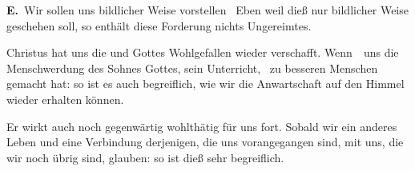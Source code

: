 \begin{aufza}
\vabst \textbf{E.}~Wir sollen uns bildlicher Weise vorstellen \usw\ Eben weil dieß nur bildlicher Weise geschehen soll, so enthält diese Forderung nichts Ungereimtes.\par
\item Christus hat uns die  und Gottes Wohlgefallen wieder verschafft. Wenn~\ uns die Menschwerdung des Sohnes Gottes, sein Unterricht, \usw\ zu besseren Menschen gemacht hat: so ist es auch begreiflich, wie wir die Anwartschaft auf den Himmel wieder erhalten können.\par
\item Er wirkt auch noch gegenwärtig wohlthätig für uns fort. Sobald wir ein anderes Leben und eine Verbindung derjenigen, die uns vorangegangen sind, mit uns, die wir noch übrig sind, glauben: so ist dieß sehr begreiflich.
\end{aufza}

